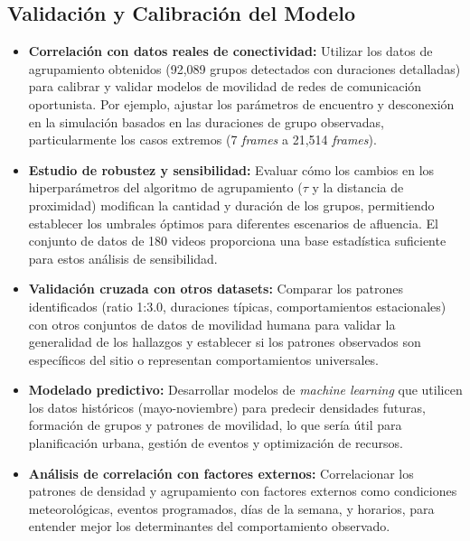 \subsection{Validación y Calibración del Modelo}
\begin{itemize}
	\item \textbf{Correlación con datos reales de conectividad:} Utilizar los datos de agrupamiento obtenidos (92,089 grupos detectados con duraciones detalladas) para calibrar y validar modelos de movilidad de redes de comunicación oportunista. Por ejemplo, ajustar los parámetros de encuentro y desconexión en la simulación basados en las duraciones de grupo observadas, particularmente los casos extremos (7 \textit{frames} a 21,514 \textit{frames}).
	
	\item \textbf{Estudio de robustez y sensibilidad:} Evaluar cómo los cambios en los hiperparámetros del algoritmo de agrupamiento ($\tau$ y la distancia de proximidad) modifican la cantidad y duración de los grupos, permitiendo establecer los umbrales óptimos para diferentes escenarios de afluencia. El conjunto de datos de 180 videos proporciona una base estadística suficiente para estos análisis de sensibilidad.
	
	\item \textbf{Validación cruzada con otros datasets:} Comparar los patrones identificados (ratio 1:3.0, duraciones típicas, comportamientos estacionales) con otros conjuntos de datos de movilidad humana para validar la generalidad de los hallazgos y establecer si los patrones observados son específicos del sitio o representan comportamientos universales.
	
	\item \textbf{Modelado predictivo:} Desarrollar modelos de \textit{machine learning} que utilicen los datos históricos (mayo-noviembre) para predecir densidades futuras, formación de grupos y patrones de movilidad, lo que sería útil para planificación urbana, gestión de eventos y optimización de recursos.
	
	\item \textbf{Análisis de correlación con factores externos:} Correlacionar los patrones de densidad y agrupamiento con factores externos como condiciones meteorológicas, eventos programados, días de la semana, y horarios, para entender mejor los determinantes del comportamiento observado.
\end{itemize}

